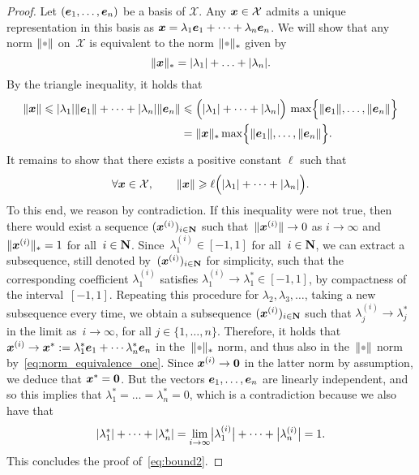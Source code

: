 \begin{proof}
    Let $(\mathbf{\boldsymbol{e}}_1, \dotsc, \mathbf{\boldsymbol{e}}_n)$ be a basis of $\mathcal X$.
    Any $\mathbf{\boldsymbol{x}} \in \mathcal X$ admits a unique representation in this basis as $\mathbf{\boldsymbol{x}} = \lambda_1 \mathbf{\boldsymbol{e}}_1 + \dotsb + \lambda_n \mathbf{\boldsymbol{e}}_n$.
    We will show that any norm $\norm{\placeholder}$ on~$\mathcal X$ is equivalent to the norm $\norm{\placeholder}_*$ given by
    \begin{equation}
        \label{eq:norm_star}
        \lVert\mathbf{\boldsymbol{x}}\rVert_* = \lvert\lambda_1\rvert + \dotsc + \lvert\lambda_n\rvert.
    \end{equation}
    By the triangle inequality,
    it holds that
    \begin{align}
        \nonumber
        \lVert\mathbf{\boldsymbol{x}}\rVert \leqslant \lvert\lambda_1\rvert \lVert\mathbf{\boldsymbol{e}}_1\rVert + \dotsb + \lvert\lambda_n\rvert \lVert\mathbf{\boldsymbol{e}}_n\rVert
        &\leqslant \Bigl(\lvert\lambda_1\rvert + \dotsb + \lvert\lambda_n\rvert\Bigr) \,
        \max \Bigl\{\lVert\mathbf{\boldsymbol{e}}_1\rVert, \dotsc, \lVert\mathbf{\boldsymbol{e}}_n\rVert\Bigr\} \\
        \label{eq:norm_equivalence_one}
        &= \lVert\mathbf{\boldsymbol{x}}\rVert_* \max \Bigl\{\lVert\mathbf{\boldsymbol{e}}_1\rVert, \dotsc, \lVert\mathbf{\boldsymbol{e}}_n\rVert\Bigr\}.
    \end{align}
    It remains to show that
    there exists a positive constant $\ell$ such that
    \begin{equation}
        \label{eq:bound2}
        \forall \mathbf{\boldsymbol{x}} \in \mathcal X, \qquad
        \lVert\mathbf{\boldsymbol{x}}\rVert
        \geqslant \ell \Bigl( \lvert\lambda_1\rvert + \dotsb + \lvert\lambda_n\rvert \Bigr).
    \end{equation}
    To this end, we reason by contradiction.
    If this inequality were not true,
    then there would exist a sequence $(\mathbf{\boldsymbol{x}}^{(i)})_{i \in \mathbf N}$ such
    that~$\lVert\mathbf{\boldsymbol{x}}^{(i)}\rVert \to 0$ as $i \to \infty$ and $\lVert\mathbf{\boldsymbol{x}}^{(i)}\rVert_* = 1$ for all~$i \in \mathbf N$.
    Since~$\lambda_1^{(i)} \in [-1, 1]$ for all~$i \in \mathbf N$,
    we can extract a subsequence, still denoted by~$(\mathbf{\boldsymbol{x}}^{(i)})_{i \in \mathbf N}$ for simplicity,
    such that the corresponding coefficient $\lambda_1^{(i)}$ satisfies $\lambda_1^{(i)} \to \lambda_1^* \in [-1, 1]$,
    by compactness of the interval~$[-1, 1]$.
    Repeating this procedure for $\lambda_2, \lambda_3, \dots$,
    taking a new subsequence every time,
    we obtain a subsequence $(\mathbf{\boldsymbol{x}}^{(i)})_{i \in \mathbf N}$ such that $\lambda^{(i)}_j \to \lambda_j^*$ in the limit as~$i \to \infty$, for all $j \in \{1, \dotsc, n\}$.
    Therefore, it holds that $\mathbf{\boldsymbol{x}}^{(i)} \to \mathbf{\boldsymbol{x}}^* := \lambda_1^* \mathbf{\boldsymbol{e}}_1 + \dotsb \lambda_n^* \mathbf{\boldsymbol{e}}_n$ in the~$\norm{\placeholder}_*$ norm,
    and thus also in the~$\norm{\placeholder}$ norm by~\eqref{eq:norm_equivalence_one}.
    Since $\mathbf{\boldsymbol{x}}^{(i)} \to \mathbf{\boldsymbol{0}}$ in the latter norm by assumption,
    we deduce that $\mathbf{\boldsymbol{x}}^* = \mathbf{\boldsymbol{0}}$.
    But the vectors $\mathbf{\boldsymbol{e}}_1, \dotsc, \mathbf{\boldsymbol{e}}_n$ are linearly independent,
    and so this implies that $\lambda_1^* = \dots = \lambda_n^* = 0$,
    which is a contradiction because we also have that
    \[
        \lvert\lambda_1^*\rvert + \dotsb + \lvert\lambda_n^*\rvert
        = \lim_{i \to \infty} \bigl\lvert \lambda_1^{(i)} \bigr\rvert + \dotsb + \bigl\lvert \lambda_n^{(i)} \bigr\rvert = 1.
    \]
    This concludes the proof of~\eqref{eq:bound2}.
\end{proof}

